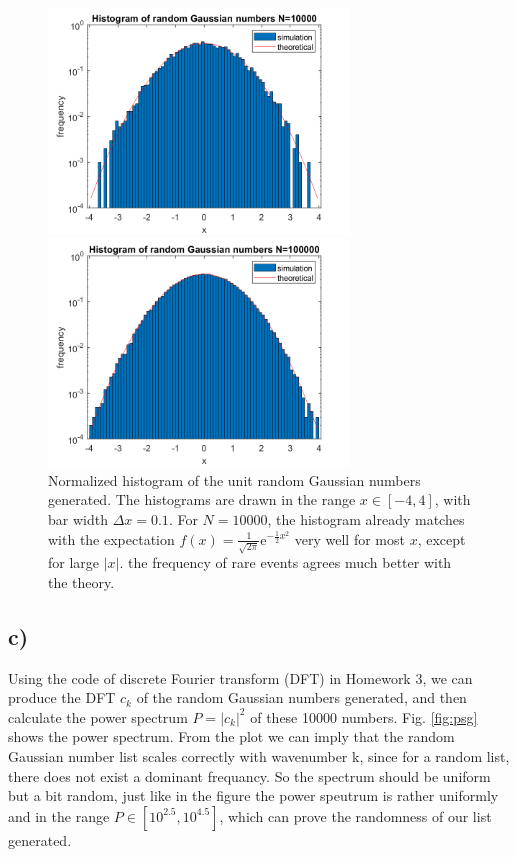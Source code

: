 \documentclass[12pt, graphicx]{article}
\begin{document}
\begin{figure}[ht]
\centering
\begin{minipage}{0.48\linewidth}
\centering
\includegraphics[width = 80mm]{rg4.png}
\end{minipage}
\begin{minipage}{0.48\linewidth}
\centering
\includegraphics[width = 80mm]{rg5.png}
\end{minipage}
\caption{Normalized histogram of the unit random Gaussian numbers generated. The histograms are drawn in the range $x\in[-4,4]$, with bar width $\Delta x=0.1$. For $N=10000$, the histogram already matches with the expectation $f(x)=\frac{1}{\sqrt{2\pi}}\mathrm{e}^{-\frac{1}{2}x^2}$ very well for most $x$, except for large $|x|$. the frequency of rare events agrees much better with the theory.}
\label{fig:rg}
\end{figure}

\subsection*{c)}
Using the code of discrete Fourier transform (DFT) in Homework 3, we can produce the DFT $c_k$ of the random Gaussian numbers generated, and then calculate the power spectrum $P=|c_k|^2$ of these 10000 numbers. Fig. \ref{fig:psg} shows the power spectrum. From the plot we can imply that the random Gaussian number list scales correctly with wavenumber k, since for a random list, there does not exist a dominant frequancy. So the spectrum should be uniform but a bit random, just like in the figure the power speutrum is rather uniformly and in the range $P\in[10^{2.5},10^{4.5}]$, which can prove the randomness of our list generated.
\end{document}
